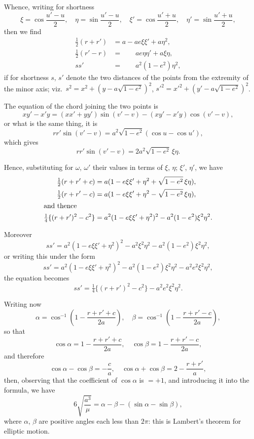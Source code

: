 \documentclass[11pt,a4paper]{article}
\theoremstyle{definition}
\begin{document}
Whence, writing for shortness
\[
\xi = \cos\frac{u'-u}{2}, \quad \eta = \sin\frac{u'-u}{2}, \quad
\xi' = \cos\frac{u'+u}{2}, \quad \eta' = \sin\frac{u'+u}{2},
\]
then we find
\begin{align*}
\tfrac12(r+r') &= a - ae\xi\xi' + a\eta^2, \\
\tfrac12(r'-r) &= \phantom{a -}\, ae\eta\eta' + a\xi\eta, \\
ss' &= \phantom{a -}\, a^2(1-e^2)\eta^2,
\end{align*}
if for shortness $s$, $s'$ denote the two distances of the points from the extremity of the
minor axis; viz.~$s^2 = x^2+(y-a\sqrt{1-e^2})^2$, $s'^2 = x'^2+(y'-a\sqrt{1-e^2})^2$.

\newpage
\noindent
The equation of the chord joining the two points is
\[
xy' - x'y = (xx' + yy')\sin(v'-v) - (xy' - x'y)\cos(v'-v),
\]
or what is the same thing, it is
\[
rr'\sin(v'-v) = a^2\sqrt{1-e^2}(\cos u - \cos u'),
\]
which gives
\[
rr'\sin(v'-v) = 2a^2\sqrt{1-e^2}\,\xi\eta.
\]

Hence, substituting for $\omega$, $\omega'$ their values in terms of $\xi$, $\eta$; $\xi'$, $\eta'$, we have
\begin{align*}
\tfrac12(r+r'+c) &= a(1-e\xi\xi' + \eta^2 + \sqrt{1-e^2}\,\xi\eta), \\
\tfrac12(r+r'-c) &= a(1-e\xi\xi' + \eta^2 - \sqrt{1-e^2}\,\xi\eta), \\
\intertext{and thence}
\tfrac14\{(r+r')^2 - c^2\} &= a^2(1-e\xi\xi'+\eta^2)^2 - a^2(1-e^2)\xi^2\eta^2.
\end{align*}

Moreover
\[
ss' = a^2(1-e\xi\xi' + \eta^2)^2 - a^2\xi^2\eta^2 - a^2(1-e^2)\xi^2\eta^2,
\]
or writing this under the form
\[
ss' = a^2(1-e\xi\xi'+\eta^2)^2 - a^2(1-e^2)\xi^2\eta^2 - a^2e^2\xi^2\eta^2,
\]
the equation becomes
\[
ss' = \tfrac14\{(r+r')^2 - c^2\} - a^2e^2\xi^2\eta^2.
\]

\newpage
\noindent
Writing now
\[
\alpha = \cos^{-1}\left(1-\frac{r+r'+c}{2a}\right), \quad
\beta = \cos^{-1}\left(1-\frac{r+r'-c}{2a}\right),
\]
so that
\[
\cos\alpha = 1 - \frac{r+r'+c}{2a}, \quad
\cos\beta = 1 - \frac{r+r'-c}{2a},
\]
and therefore
\[
\cos\alpha - \cos\beta = -\frac{c}{a}, \quad
\cos\alpha + \cos\beta = 2 - \frac{r+r'}{a},
\]
then, observing that the coefficient of $\cos\alpha$ is $=+1$, and introducing it into the formula,
we have
\[
6\sqrt{\frac{a^3}{\mu}} = \alpha - \beta - (\sin\alpha - \sin\beta),
\]
where $\alpha$, $\beta$ are positive angles each less than $2\pi$: this is Lambert's theorem for elliptic
motion.
\end{document}

